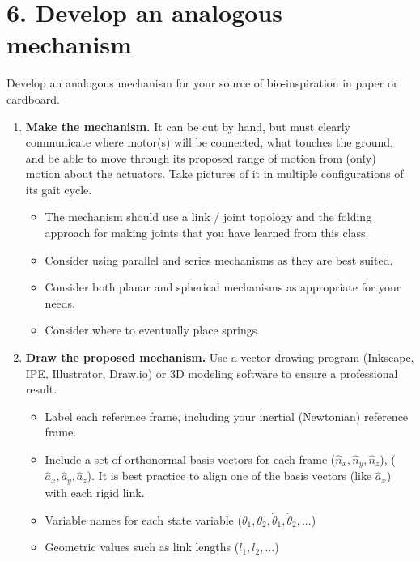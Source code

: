 \documentclass[12pt]{article}
\begin{document}
\section*{6. Develop an analogous mechanism}
Develop an analogous mechanism for your source of bio-inspiration in paper or cardboard.
\begin{enumerate}
    \item \textbf{Make the mechanism.} It can be cut by hand, but must clearly communicate where motor(s) will be connected, what touches the ground, and be able to move through its proposed range of motion from (only) motion about the actuators. Take pictures of it in multiple configurations of its gait cycle.
    \begin{itemize}
        \item The mechanism should use a link / joint topology and the folding approach for making joints that you have learned from this class.
        \item Consider using parallel and series mechanisms as they are best suited.
        \item Consider both planar and spherical mechanisms as appropriate for your needs.
        \item Consider where to eventually place springs.
    \end{itemize}
    
    \item \textbf{Draw the proposed mechanism.} Use a vector drawing program (Inkscape, IPE, Illustrator, Draw.io) or 3D modeling software to ensure a professional result.
    \begin{itemize}
        \item Label each reference frame, including your inertial (Newtonian) reference frame.
        \item Include a set of orthonormal basis vectors for each frame ($\hat{n}_x, \hat{n}_y, \hat{n}_z$), ($\hat{a}_x, \hat{a}_y, \hat{a}_z$). It is best practice to align one of the basis vectors (like $\hat{a}_x$) with each rigid link.
        \item Variable names for each state variable ($\theta_1, \theta_2, \dot{\theta}_1, \dot{\theta}_2, ...$)
        \item Geometric values such as link lengths ($l_1, l_2, ...$)
    \end{itemize}
    
    \begin{center}
    \end{center}
\end{enumerate}
\end{document}
